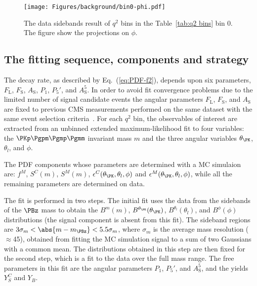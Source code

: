 \begin{figure}[!hbt]
  \centering
  \texttt{[image: Figures/background/bin0-phi.pdf]}
  \caption{The data sidebands result of $q^2$ bins in the Table~\ref{tab:q2 bins} bin 0. The figure
    show the projections on $\phi$.}
  \label{fig:bin0-bkg-phi}
\end{figure}

\subsection{The fitting sequence, components and strategy}
\label{sec:fitseq}

The decay rate, as described by Eq.~(\ref{eq:PDF-f2}), depends upon six parameters,
$F_\mathrm{L}$, $F_\mathrm{S}$, $A_\mathrm{S}$, $P_1$, $P_5'$, and $A^5_\mathrm{S}$.
In order to avoid fit convergence problems due to the limited number of
signal candidate events the angular parameters $F_\mathrm{L}$, $F_\mathrm{S}$,
and $A_\mathrm{S}$ are fixed to previous CMS measurements performed
on the same dataset with the same event selection criteria~\cite{CMS:2012}.
For each $q^2$ bin, the observables of interest are extracted from an unbinned
extended maximum-likelihood fit to four variables: the $\PKp\Pgpm\Pgmp\Pgmm$
invariant mass $m$ and the three angular variables ${\theta_\PK}$, ${\theta_l}$,
and $\phi$.

The PDF components whose parameters are determined with a MC simulaion are:
$f^{M}$, $S^{C}(m)$, $S^{M}(m)$, $\epsilon^{C}(\theta_\PK,\theta_l,\phi)$ and $\epsilon^{M}(\theta_\PK,\theta_l,\phi)$,
while all the remaining parameters are determined on data.

The fit is performed in two steps. The initial fit uses the data from the sidebands of the $\PBz$
mass to obtain the $B^m(m)$, $B^{\theta_\PK}(\theta_\PK)$, $B^{\theta_l}(\theta_l)$, and $B^{\phi}(\phi)$
distributions (the signal component is absent from this fit). The sideband regions are
$3\sigma_m < \abs{m-m_{\PBz}} < 5.5\sigma_m$, where $\sigma_m$ is the average mass resolution ($\approx$45\MeV),
obtained from fitting the MC simulation signal to a sum of two Gaussians with a common mean. The distributions
obtained in this step are then fixed for the second step, which is a fit to the data over the full mass range.
The free parameters in this fit are the angular parameters $P_1$, $P_5'$, and $A^5_\mathrm{S}$,
and the yields $Y^{C}_{S}$ and $Y_{B}$.

